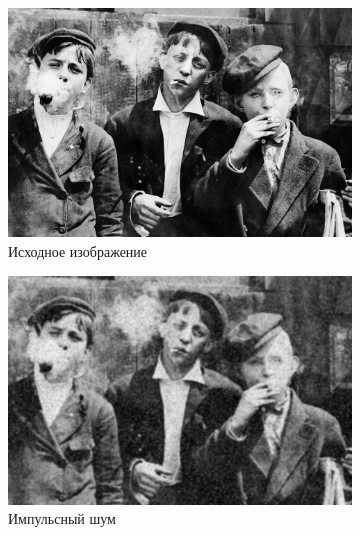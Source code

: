   \begin{figure}[ht] 
    \centering
    \begin{subfigure}[b]{0.5\linewidth}
        \centering
        \includegraphics[width=0.95\linewidth]{../lewis-hine-taschen-main-3.jpg} 
        \caption{Исходное изображение} 
        \label{gaussian_11:a} 
        \vspace{4ex}
    \end{subfigure}%
    \begin{subfigure}[b]{0.5\linewidth}
      \centering
      \includegraphics[width=0.95\linewidth]{../Gaussian_Blur/Gaussian_Blur_Impulse_noise_(11,11).jpg} 
      \caption{Импульсный шум} 
      \label{gaussian_11:b} 
      \vspace{4ex}
    \end{subfigure}
    \begin{subfigure}[b]{0.5\linewidth}
      \centering

\end{subfigure}
\end{figure}
